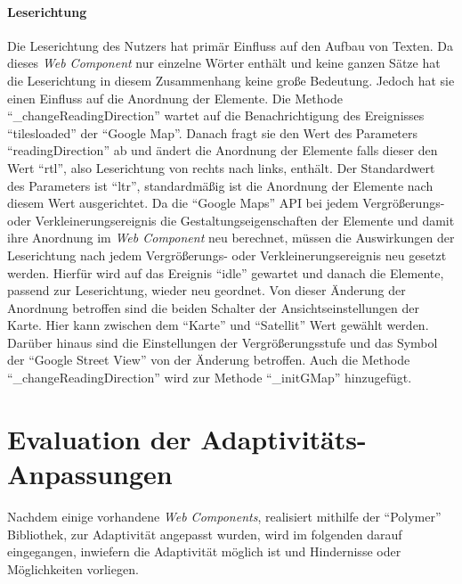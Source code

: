\documentclass[12pt, paper=a4, bibtotoc, toc=listof, headsepline=true]{scrreprt}
\begin{document}
	\subsubsection{Leserichtung}
	Die Leserichtung des Nutzers hat primär Einfluss auf den Aufbau von Texten. Da dieses \emph{Web Component} nur einzelne Wörter enthält und keine ganzen Sätze hat die Leserichtung in diesem Zusammenhang keine große Bedeutung. Jedoch hat sie einen Einfluss auf die Anordnung der Elemente. Die Methode \enquote{\_changeReadingDirection} wartet auf die Benachrichtigung des Ereignisses \enquote{tilesloaded} der \enquote{Google Map}. Danach fragt sie den Wert des Parameters \enquote{readingDirection} ab und ändert die Anordnung der Elemente falls dieser den Wert \enquote{rtl}, also Leserichtung von rechts nach links, enthält. Der Standardwert des Parameters ist \enquote{ltr}, standardmäßig ist die Anordnung der Elemente nach diesem Wert ausgerichtet. Da die \enquote{Google Maps} \ac{API} bei jedem Vergrößerungs- oder Verkleinerungsereignis die Gestaltungseigenschaften der Elemente und damit ihre Anordnung im \emph{Web Component} neu berechnet, müssen die Auswirkungen der Leserichtung nach jedem Vergrößerungs- oder Verkleinerungsereignis neu gesetzt werden. Hierfür wird auf das Ereignis \enquote{idle} gewartet und danach die Elemente, passend zur Leserichtung, wieder neu geordnet. Von dieser Änderung der Anordnung betroffen sind die beiden Schalter der Ansichtseinstellungen der Karte. Hier kann zwischen dem \enquote{Karte} und \enquote{Satellit} Wert gewählt werden. Darüber hinaus sind die Einstellungen der Vergrößerungsstufe und das Symbol der \enquote{Google Street View} von der Änderung betroffen. Auch die Methode \enquote{\_changeReadingDirection} wird zur Methode \enquote{\_initGMap} hinzugefügt.
	\newpage
\chapter{Evaluation der Adaptivitäts-Anpassungen}
Nachdem einige vorhandene \emph{Web Components}, realisiert mithilfe der \enquote{Polymer} Bibliothek, zur Adaptivität angepasst wurden, wird im folgenden darauf eingegangen, inwiefern die Adaptivität möglich ist und Hindernisse oder Möglichkeiten vorliegen.
\end{document}
